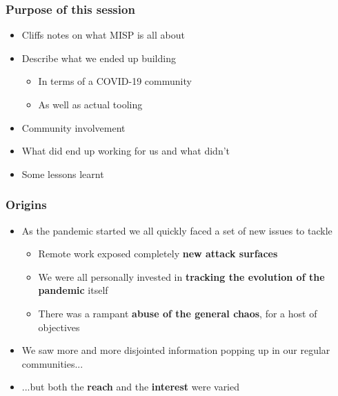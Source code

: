 
\begin{frame}[t,plain]
\titlepage
\end{frame}

\begin{frame}
 \frametitle{Purpose of this session}
 \begin{itemize}
         \item Cliffs notes on what MISP is all about
         \item Describe what we ended up building
         \begin{itemize}
              \item In terms of a COVID-19 community
              \item As well as actual tooling
         \end{itemize}
         \item Community involvement
         \item What did end up working for us and what didn't
         \item Some lessons learnt
 \end{itemize}
\end{frame}

\begin{frame}
 \frametitle{Origins}
 \begin{itemize}
         \item As the pandemic started we all quickly faced a set of new issues to tackle
         \begin{itemize}
              \item Remote work exposed completely {\bf new attack surfaces}
              \item We were all personally invested in {\bf tracking the evolution of the pandemic} itself
              \item There was a rampant {\bf abuse of the general chaos}, for a host of objectives
         \end{itemize}
         \item We saw more and more disjointed information popping up in our regular communities...
         \item ...but both the {\bf reach} and the {\bf interest} were varied
 \end{itemize}
\end{frame}

